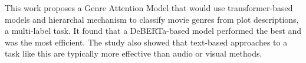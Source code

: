 This work proposes a Genre Attention Model that would use transformer-based models and hierarchal mechanism to classify movie genres from plot descriptions, a multi-label task. It found that a DeBERTa-based model performed the best and was the most efficient. The study also showed that text-based approaches to a task like this are typically more effective than audio or visual methods. 